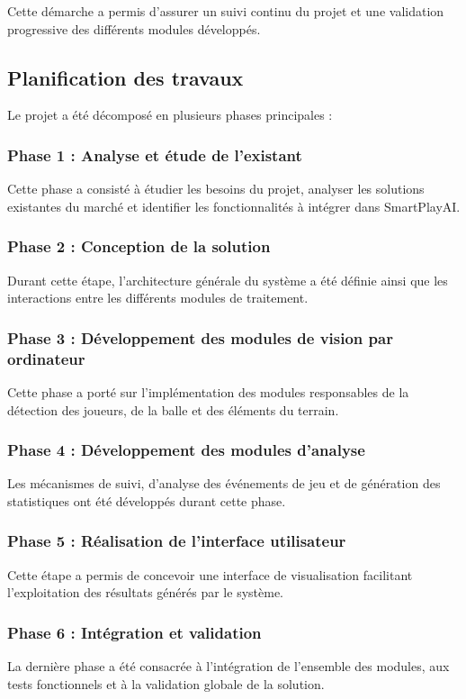 \begin{itemize}
Cette démarche a permis d'assurer un suivi continu du projet et une validation progressive des différents modules développés.

\subsection{Planification des travaux}
Le projet a été décomposé en plusieurs phases principales :

\subsubsection{Phase 1 : Analyse et étude de l'existant}
Cette phase a consisté à étudier les besoins du projet, analyser les solutions existantes du marché et identifier les fonctionnalités à intégrer dans SmartPlayAI.

\subsubsection{Phase 2 : Conception de la solution}
Durant cette étape, l'architecture générale du système a été définie ainsi que les interactions entre les différents modules de traitement.

\subsubsection{Phase 3 : Développement des modules de vision par ordinateur}
Cette phase a porté sur l'implémentation des modules responsables de la détection des joueurs, de la balle et des éléments du terrain.

\subsubsection{Phase 4 : Développement des modules d'analyse}
Les mécanismes de suivi, d'analyse des événements de jeu et de génération des statistiques ont été développés durant cette phase.

\subsubsection{Phase 5 : Réalisation de l'interface utilisateur}
Cette étape a permis de concevoir une interface de visualisation facilitant l'exploitation des résultats générés par le système.

\subsubsection{Phase 6 : Intégration et validation}
La dernière phase a été consacrée à l'intégration de l'ensemble des modules, aux tests fonctionnels et à la validation globale de la solution.



\end{itemize}
